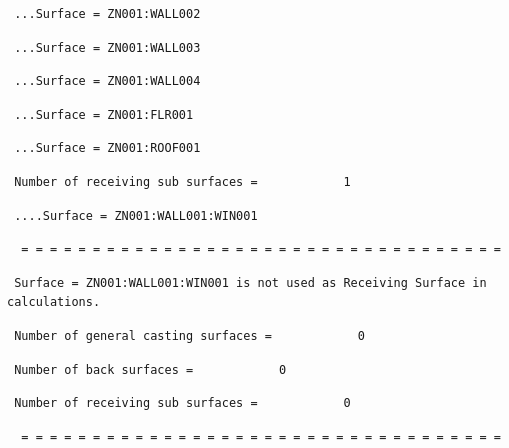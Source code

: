 \begin{lstlisting}
 ...Surface = ZN001:WALL002
\end{lstlisting}

\begin{lstlisting}
 ...Surface = ZN001:WALL003
\end{lstlisting}

\begin{lstlisting}
 ...Surface = ZN001:WALL004
\end{lstlisting}

\begin{lstlisting}
 ...Surface = ZN001:FLR001
\end{lstlisting}

\begin{lstlisting}
 ...Surface = ZN001:ROOF001
\end{lstlisting}

\begin{lstlisting}
 Number of receiving sub surfaces =            1
\end{lstlisting}

\begin{lstlisting}
 ....Surface = ZN001:WALL001:WIN001
\end{lstlisting}

\begin{lstlisting}
  = = = = = = = = = = = = = = = = = = = = = = = = = = = = = = = = = =
\end{lstlisting}

\begin{lstlisting}
 Surface = ZN001:WALL001:WIN001 is not used as Receiving Surface in calculations.
\end{lstlisting}

\begin{lstlisting}
 Number of general casting surfaces =            0
\end{lstlisting}

\begin{lstlisting}
 Number of back surfaces =            0
\end{lstlisting}

\begin{lstlisting}
 Number of receiving sub surfaces =            0
\end{lstlisting}

\begin{lstlisting}
  = = = = = = = = = = = = = = = = = = = = = = = = = = = = = = = = = =
\end{lstlisting}

